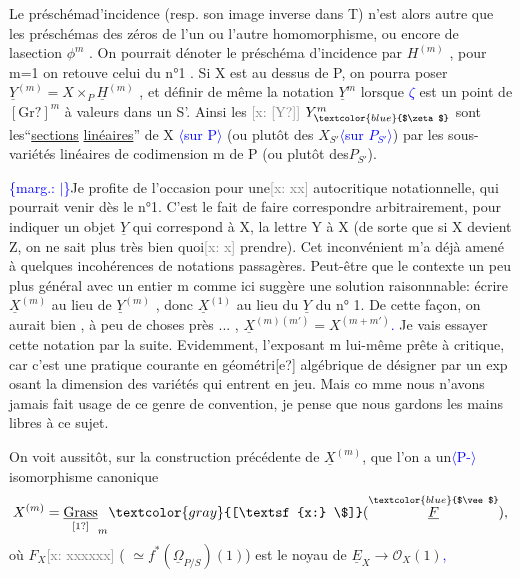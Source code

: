 \documentclass[11pt]{article}
\newcommand{\scanpage}[1]{\par\bigskip\noindent{\small\sffamily[scan #1]}\par}
\newcommand{\mspage}[1]{{\small\sffamily[p.\,#1]}}
\newcommand{\hand}[1]{\textcolor{blue}{#1}}
\newcommand{\inserted}[2][]{\textcolor{blue}{$\langle$#2$\rangle$}}
\newcommand{\margin}[1]{\textcolor{blue}{\{\textsf{marg.:} #1\}}}
\newcommand{\xout}[1]{\textcolor{gray}{[\textsf{x:} #1]}}
\newcommand{\uline}[1]{\underline{#1}}
\newcommand{\unsure}[1]{[#1?]}
\begin{document}
Le préschémad'incidence  (resp. son image inverse dans T) n'est alors
autre que les préschémas des zéros de l'un ou l'autre homomorphisme,
ou encore de lasection $\phi^{m}$ .  On pourrait dénoter le préschéma
d'incidence par $H^{(m)}$ , pour m=1 on retouve celui du n°1 .  Si X est
au dessus de P, on pourra poser $\underline{Y}^{(m)} = X\times_{P} \underline{H}^{(m)}$ ,  et définir de même
la notation $\underline{Y}^{m}$ lorsque \hand{$\zeta$} est un point de $\unsure{\mathrm{Gr}}^{m}$ à valeurs dans un S'.
Ainsi les \xout{\unsure{Y}} $Y^{m}_{\hand{$\zeta$}}$  sont les``\uline{sections} \uline{linéaires}''  de X \inserted{sur P} (ou plutôt des
$X_{S'}$\inserted{sur $P_{S'}$})   par les sous-variétés linéaires de codimension m de P (ou
plutôt des$P_{S'}$).

\margin{$|$}Je profite de l'occasion pour une\xout{xx}  autocritique notationnelle,
qui pourrait venir dès le n°1. C'est le fait  de faire correspondre
arbitrairement, pour indiquer un objet $\underline{Y}$ qui correspond à X, la lettre
Y à X  (de sorte que si X devient Z, on ne sait plus très bien quoi\xout{x}
prendre). Cet inconvénient m'a déjà amené à quelques incohérences de
notations passagères.  Peut-être que le contexte un peu plus général
avec un entier m comme ici suggère une solution raisonnnable: écrire
$\underline{X}^{(m)}$ au lieu de  $\underline{Y}^{(m)}$ , donc  $\underline{X}^{(1)}$ au lieu du  $\underline{Y}$  du n° 1. De cette
façon, on  aurait bien , à peu de choses près ... ,  $\underline{X}^{(m)(m')} = X^{(m+m')}$\hand{.}
Je vais essayer cette notation par la suite.  Evidemment, l'exposant m
lui-même prête à critique, car  c'est une pratique courante en géométri\unsure{e}
algébrique de désigner par un exp osant la dimension des variétés qui
entrent en jeu. Mais co mme nous n'avons jamais fait usage de ce genre
de convention, je pense que nous gardons les mains libres à ce sujet.

On voit aussitôt, sur la construction précédente de $\underline{X}^{(m)}$, que
l'on a un\inserted{P-}isomorphisme canonique
\[ X^{(m)} = \underset{\unsure{1}}{\underline{\mathrm{Grass}}}_{m}\xout{\$}(\overset{\hand{$\vee$}}{\underline{F}}) , \]
où  $F_{X}$\xout{xxxxxx}  ( $\simeq f^{*}(\underline{\Omega}_{P/S})(1)$)   est le noyau de  $\underline{E}_{X} \longrightarrow \mathcal{O}_{X}(1)$\hand{,}

\mspage{67}

\clearpage
\scanpage{25/68}
\mspage{63}
\end{document}

